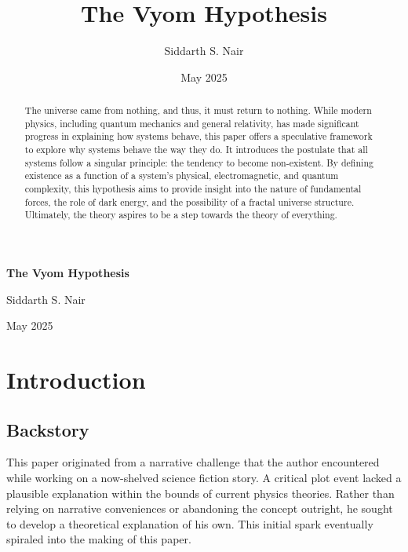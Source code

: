 \documentclass{article}
\title{The Vyom Hypothesis}
\author{Siddarth S. Nair}
\date{May 2025}
\begin{document}
\begin{titlepage}
    \centering
    \vspace*{\fill}
    {\Huge\bfseries The Vyom Hypothesis \par}
    \vspace{1cm}
    {\Large Siddarth S. Nair \par}
    \vspace{0.5cm}
    {\large May 2025 \par}
    \vspace*{\fill}
    \thispagestyle{empty}
\end{titlepage}



\newpage
\begin{abstract}
    The universe came from nothing, and thus, it must return to nothing. While modern physics, including quantum mechanics and general relativity, has made significant progress in explaining how systems behave, this paper offers a speculative framework to explore why systems behave the way they do. It introduces the postulate that all systems follow a singular principle: the tendency to become non-existent. By defining existence as a function of a system's physical, electromagnetic, and quantum complexity, this hypothesis aims to provide insight into the nature of fundamental forces, the role of dark energy, and the possibility of a fractal universe structure. Ultimately, the theory aspires to be a step towards the theory of everything.
\end{abstract}



\newpage
\tableofcontents



\newpage
\section{Introduction}


\subsection{Backstory}
This paper originated from a narrative challenge that the author encountered while working on a now-shelved science fiction story. A critical plot event lacked a plausible explanation within the bounds of current physics theories. Rather than relying on narrative conveniences or abandoning the concept outright, he sought to develop a theoretical explanation of his own. This initial spark eventually spiraled into the making of this paper.
\end{document}
